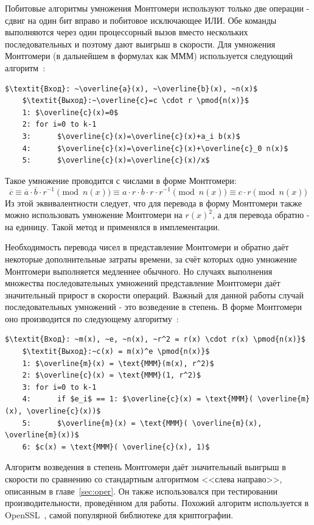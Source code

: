 \documentclass[times,specification,annotation]{itmo-student-thesis}
\begin{document}
Побитовые алгоритмы умножения Монтгомери используют только две операции - сдвиг на один бит вправо и побитовое исключающее ИЛИ.
Обе команды выполняются через один процессорный вызов вместо нескольких последовательных и поэтому дают выигрыш в скорости.
Для умножения Монтгомери (в дальнейшем в формулах как МММ) используется следующий алгоритм~\cite{koc98}:
\begin{lstlisting}[mathescape=true]
    $\textit{Вход}: ~\overline{a}(x), ~\overline{b}(x), ~n(x)$
    $\textit{Выход}:~\overline{c}=c \cdot r \pmod{n(x)}$
    1: $\overline{c}(x)=0$
    2: for i=0 to k-1
    3:      $\overline{c}(x)=\overline{c}(x)+a_i b(x)$
    4:      $\overline{c}(x)=\overline{c}(x)+\overline{c}_0 n(x)$
    5:      $\overline{c}(x)=\overline{c}(x)/x$
\end{lstlisting}
Такое умножение проводится с числами в форме Монтгомери:
\[\overline{c} \equiv \overline{a} \cdot \overline{b} \cdot r^{-1} \pmod{n(x)}
\equiv a \cdot r \cdot b \cdot r \cdot r^{-1} \pmod{n(x)}
\equiv c \cdot r \pmod{n(x)}\]
Из этой эквивалентности следует, что для перевода в форму Монтгомери также можно использовать умножение Монтгомери на $r(x)^2$,
а для перевода обратно - на единицу.
Такой метод и применялся в имплементации.

Необходимость перевода чисел в представление Монтгомери и обратно даёт некоторые дополнительные затраты времени, за счёт которых одно умножение Монтгомери выполняется медленнее обычного.
Но случаях выполнения множества последовательных умножений представление Монтгомери даёт значительный прирост в скорости операций.
Важный для данной работы случай последовательных умножений - это возведение в степень.
В форме Монтгомери оно производится по следующему алгоритму~\cite{koc97}:
\begin{lstlisting}[mathescape=true]
    $\textit{Вход}: ~m(x), ~e, ~n(x), ~r^2 = r(x) \cdot r(x) \pmod{n(x)}$
    $\textit{Выход}:~c(x) = m(x)^e \pmod{n(x)}$
    1: $\overline{m}(x) = \text{MMM}(m(x), r^2)$
    2: $\overline{c}(x) = \text{MMM}(1, r^2)$
    3: for i=0 to k-1
    4:      if $e_i$ == 1: $\overline{c}(x) = \text{MMM}( \overline{m}(x), \overline{c}(x))$
    5:      $\overline{m}(x) = \text{MMM}( \overline{m}(x), \overline{m}(x))$
    6: $c(x) = \text{MMM}( \overline{c}(x), 1)$
\end{lstlisting}

Алгоритм возведения в степень Монтгомери даёт значительный выигрыш в скорости по сравнению со стандартным алгоритмом
<<слева направо>>, описанным в главе~\ref{sec:oper}.
Он также использовался при тестировании производительности, проведённом для работы.
Похожий алгоритм используется в OpenSSL~\cite{openssl}, самой популярной библиотеке для криптографии.
\end{document}
